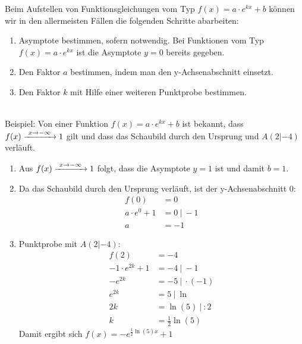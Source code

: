 Beim Aufstellen von Funktionsgleichungen vom Typ \(f(x)=a\cdot e^{kx}+b\) können wir in den allermeisten Fällen die folgenden Schritte abarbeiten:
\begin{enumerate}[label=\arabic*)]
	\item Asymptote bestimmen, sofern notwendig. Bei Funktionen vom Typ \(f(x)=a\cdot e^{kx}\) ist die Asymptote \(y=0\) bereits gegeben.
	\item Den Faktor \(a\) bestimmen, indem man den y-Achsenabschnitt einsetzt.
	\item Den Faktor \(k\) mit Hilfe einer weiteren Punktprobe bestimmen.
\end{enumerate}
\hphantom{x}\\
Beispiel: Von einer Funktion \(f(x)=a\cdot e^{kx}+b\) ist bekannt, dass \(f(x)\xrightarrow{\hphantom{\ }x\to-\infty\hphantom{\ }}1\) gilt und dass das Schaubild durch den Ursprung und \(A(2|-4)\) verläuft.
\textcolor{loes}{
	\begin{enumerate}[label=\arabic*)]
		\item Aus \(f(x)\xrightarrow{\hphantom{\ }x\to-\infty\hphantom{\ }}1\) folgt, dass die Asymptote \(y=1\) ist und damit \(b=1\).
		\item Da das Schaubild durch den Ursprung verläuft, ist der y-Achsenabschnitt 0:
		\begin{align*}
			f(0)&=0\\
			a\cdot e^0+1&=0\ |\ -1\\
			a&=-1
		\end{align*}
		\item Punktprobe mit \(A(2|-4)\):
		\begin{align*}
			f(2)&=-4\\
			-1\cdot e^{2k}+1&=-4\ |\ -1\\
			-e^{2k}&=-5\ |\ \cdot(-1)\\
			e^{2k}&=5\ |\ \ln\\
			2k&=\ln\left(5\right)\ |\ :2\\
			k&=\frac{1}{2}\ln\left(5\right)
		\end{align*}
		Damit ergibt sich \(f(x)=-e^{\frac{1}{2}\ln\left(5\right)x}+1\)
\end{enumerate}}
\newpage
